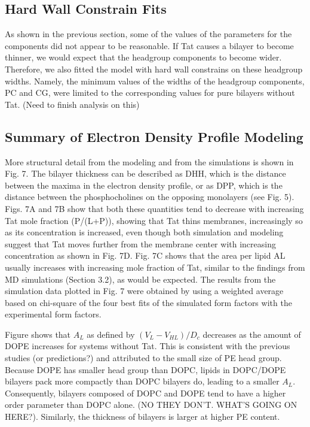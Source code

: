 \subsection{Hard Wall Constrain Fits}
As shown in the previous section, some of the values of the parameters
for the components did not appear to be reasonable. If Tat causes a bilayer 
to become thinner, we would expect that the headgroup components to become
wider. Therefore, we also fitted the model with hard wall constrains
on these headgroup widths. Namely, the minimum values of the widths of
the headgroup components, PC and CG, were limited to the corresponding 
values for pure bilayers without Tat. (Need to finish analysis on this)

\subsection{Summary of Electron Density Profile Modeling}
More structural detail from the modeling and from the simulations is shown 
in Fig. 7. The
bilayer thickness can be described as DHH, which is the distance between 
the maxima in the
electron density profile, or as DPP, which is the distance between the 
phosphocholines on the
opposing monolayers (see Fig. 5). Figs. 7A and 7B show that both these 
quantities tend to
decrease with increasing Tat mole fraction (P/(L+P)), showing that Tat thins 
membranes,
increasingly so as its concentration is increased, even though both simulation 
and modeling
suggest that Tat moves further from the membrane center with increasing 
concentration as
shown in Fig. 7D. Fig. 7C shows that the area per lipid AL usually increases 
with increasing
mole fraction of Tat, similar to the findings from MD simulations (Section 3.2), 
as would be
expected. The results from the simulation data plotted in Fig. 7 were obtained 
by using a
weighted average based on chi-square of the four best fits of the simulated 
form factors with the
experimental form factors.

Figure shows that $A_L$ as defined by $(V_L-V_{HL})/D_c$ decreases as the 
amount of DOPE increases for systems without Tat. This is consistent with the
previous studies (or predictions?) and attributed to the small size of PE
head group. Because DOPE has smaller head group than DOPC, lipids in DOPC/DOPE
bilayers pack more compactly than DOPC bilayers do, leading to a smaller $A_L$.
Consequently, bilayers composed of DOPC and DOPE tend to have a higher order 
parameter than DOPC alone. (NO THEY DON'T. WHAT'S GOING ON HERE?). Similarly,
the thickness of bilayers is larger at higher PE content. 

